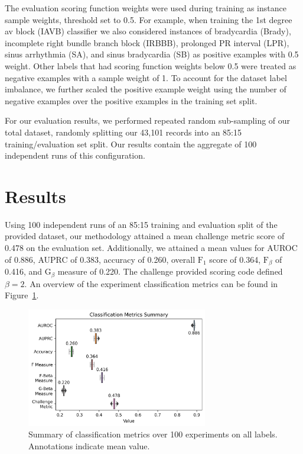 \documentclass[twocolumn]{cinc}
\begin{document}
The evaluation scoring function weights were used during training as instance sample weights, threshold set to 0.5.
For example, when training the 1st degree av block (IAVB) classifier we also considered instances of bradycardia (Brady), incomplete right bundle branch block (IRBBB), prolonged PR interval (LPR), sinus arrhythmia (SA), and sinus bradycardia (SB) as positive examples with 0.5 weight.
Other labels that had scoring function weights below 0.5 were treated as negative examples with a sample weight of 1.
To account for the dataset label imbalance, we further scaled the positive example weight using the number of negative examples over the positive examples in the training set split.

For our evaluation results, we performed repeated random sub-sampling of our total dataset, randomly splitting our 43,101 records into an 85:15 training/evaluation set split.
Our results contain the aggregate of 100 independent runs of this configuration.

\section{Results}

Using 100 independent runs of an 85:15 training and evaluation split of the provided dataset, our methodology attained a mean challenge metric score of 0.478 on the evaluation set.
Additionally, we attained a mean values for AUROC of 0.886, AUPRC of 0.383, accuracy of 0.260, overall $\text{F}_1$ score of 0.364, $\text{F}_\beta$ of 0.416, and $\text{G}_\beta$ measure of 0.220.
The challenge provided scoring code defined $\beta = 2$.
An overview of the experiment classification metrics can be found in Figure~\ref{fig:classification_metrics_summary}.

\begin{figure}[ht]
  \centering
  \includegraphics[width=7.9cm]{fig/classification_metrics.png}
  \caption{Summary of classification metrics over 100 experiments on all labels. Annotations indicate mean value.}
  \label{fig:classification_metrics_summary}
\end{figure}
\end{document}
